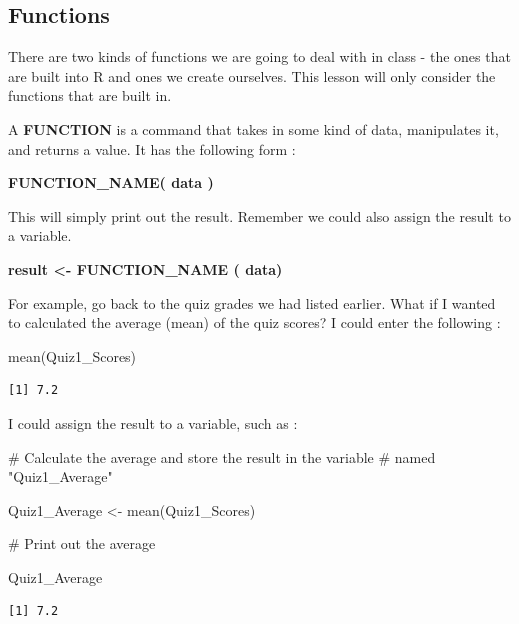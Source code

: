\documentclass[
  letterpaper,
  DIV=11,
  numbers=noendperiod]{scrreprt}
\newenvironment{Shaded}{\begin{snugshade}}{\end{snugshade}}
\newcommand{\CommentTok}[1]{\textcolor[rgb]{0.37,0.37,0.37}{#1}}
\newcommand{\FunctionTok}[1]{\textcolor[rgb]{0.28,0.35,0.67}{#1}}
\newcommand{\NormalTok}[1]{\textcolor[rgb]{0.00,0.23,0.31}{#1}}
\newcommand{\OtherTok}[1]{\textcolor[rgb]{0.00,0.23,0.31}{#1}}
\begin{document}
\subsection*{Functions}\label{functions}

There are two kinds of functions we are going to deal with in class -
the ones that are built into R and ones we create ourselves. This lesson
will only consider the functions that are built in.

A \textbf{FUNCTION} is a command that takes in some kind of data,
manipulates it, and returns a value. It has the following form :

\textbf{FUNCTION\_NAME( data )}

This will simply print out the result. Remember we could also assign the
result to a variable.

\textbf{result \textless- FUNCTION\_NAME ( data)}

For example, go back to the quiz grades we had listed earlier. What if I
wanted to calculated the average (mean) of the quiz scores? I could
enter the following :

\begin{Shaded}
\begin{Highlighting}[]
\FunctionTok{mean}\NormalTok{(Quiz1\_Scores)}
\end{Highlighting}
\end{Shaded}

\begin{verbatim}
[1] 7.2
\end{verbatim}

I could assign the result to a variable, such as :

\begin{Shaded}
\begin{Highlighting}[]
\CommentTok{\# Calculate the average and store the result in the variable }
\CommentTok{\# named "Quiz1\_Average"}

\NormalTok{Quiz1\_Average }\OtherTok{\textless{}{-}} \FunctionTok{mean}\NormalTok{(Quiz1\_Scores)}

\CommentTok{\# Print out the average}

\NormalTok{Quiz1\_Average}
\end{Highlighting}
\end{Shaded}

\begin{verbatim}
[1] 7.2
\end{verbatim}
\end{document}
